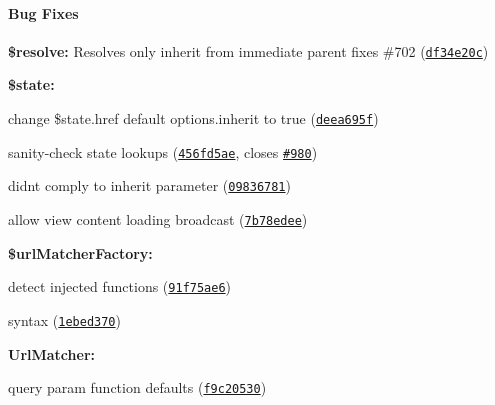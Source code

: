 {\bfseries {\bfseries {\bfseries {\bfseries }}}}

{\bfseries {\bfseries {\bfseries {\bfseries \paragraph*{Bug Fixes}}}}}

{\bfseries {\bfseries {\bfseries {\bfseries }}}}

{\bfseries {\bfseries {\bfseries {\bfseries 
\begin{DoxyItemize}
\item {\bfseries \$resolve\+:} Resolves only inherit from immediate parent fixes \#702 (\href{https://github.com/angular-ui/ui-router/commit/df34e20c576299e7a3c8bd4ebc68d42341c0ace9}{\tt df34e20c})
\item {\bfseries \$state\+:}
\begin{DoxyItemize}
\item change \$state.\+href default options.\+inherit to true (\href{https://github.com/angular-ui/ui-router/commit/deea695f5cacc55de351ab985144fd233c02a769}{\tt deea695f})
\item sanity-\/check state lookups (\href{https://github.com/angular-ui/ui-router/commit/456fd5aec9ea507518927bfabd62b4afad4cf714}{\tt 456fd5ae}, closes \href{https://github.com/angular-ui/ui-router/issues/980}{\tt \#980})
\item didn\textquotesingle{}t comply to inherit parameter (\href{https://github.com/angular-ui/ui-router/commit/09836781f126c1c485b06551eb9cfd4fa0f45c35}{\tt 09836781})
\item allow view content loading broadcast (\href{https://github.com/angular-ui/ui-router/commit/7b78edeeb52a74abf4d3f00f79534033d5a08d1a}{\tt 7b78edee})
\end{DoxyItemize}
\item {\bfseries \$url\+Matcher\+Factory\+:}
\begin{DoxyItemize}
\item detect injected functions (\href{https://github.com/angular-ui/ui-router/commit/91f75ae66c4d129f6f69e53bd547594e9661f5d5}{\tt 91f75ae6})
\item syntax (\href{https://github.com/angular-ui/ui-router/commit/1ebed37069bae8614d41541d56521f5c45f703f3}{\tt 1ebed370})
\end{DoxyItemize}
\item {\bfseries Url\+Matcher\+:}
\begin{DoxyItemize}
\item query param function defaults (\href{https://github.com/angular-ui/ui-router/commit/f9c205304f10d8a4ebe7efe9025e642016479a51}{\tt f9c20530})

\end{DoxyItemize}
\end{DoxyItemize}}}}}
